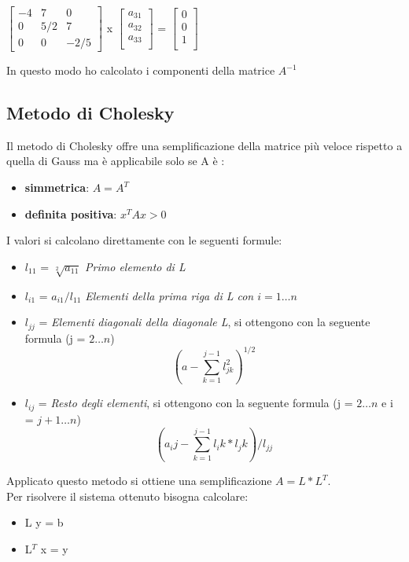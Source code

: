 \begin{center}
$
\begin{bmatrix}
-4 & 7 & 0 \\
0 & 5/2 & 7 \\
0 & 0 & -2/5 
\end{bmatrix}
$
x
$
\begin{bmatrix}
a_{31} \\
a_{32} \\
a_{33} \\
\end{bmatrix}
$
=
$
\begin{bmatrix}
0 \\
0 \\
1 \\
\end{bmatrix}
$
\end{center}

In questo modo ho calcolato i componenti della matrice $A^{-1}$

\subsection{Metodo di Cholesky}
\label{Metodo di Cholesky}
Il metodo di Cholesky offre una semplificazione della matrice più veloce rispetto a quella di Gauss ma è applicabile solo se A è :
\begin{itemize}
\item \textbf{simmetrica}: $A = A^T$
\item \textbf{definita positiva}: $x^T A x > 0$ 
\end{itemize}
\noindent
I valori si calcolano direttamente con le seguenti formule:
\begin{itemize}
\item $l_{11}$ = $\sqrt[2]{a_{11}}$ \quad \quad \quad \textit{Primo elemento di L}
\item $l_{i1}$ = $a_{i1}/ l_{11} $ \quad \quad \textit{Elementi della prima riga di L con $i = 1\dots n$}
\item $l_{jj}$ = \textit{Elementi diagonali della diagonale L}, si ottengono con la seguente formula (j = $2\dots n$) $$(a - \sum_{k=1}^{j-1} l^2_{jk})^{1/2}$$ 
\item $l_{ij}$ = \textit{Resto degli elementi}, si ottengono con la seguente formula (j = $2\dots n$ e i = $j+1\dots n$) $$(a_ij-\sum_{k=1}^{j-1}l_ik*l_jk)/l_{jj}$$
\end{itemize}
Applicato questo metodo si ottiene una semplificazione $A = L * L^T$.
\\
Per risolvere il sistema ottenuto bisogna calcolare:
\begin{itemize}
\item L y = b
\item L$^T$ x = y
\end{itemize}

